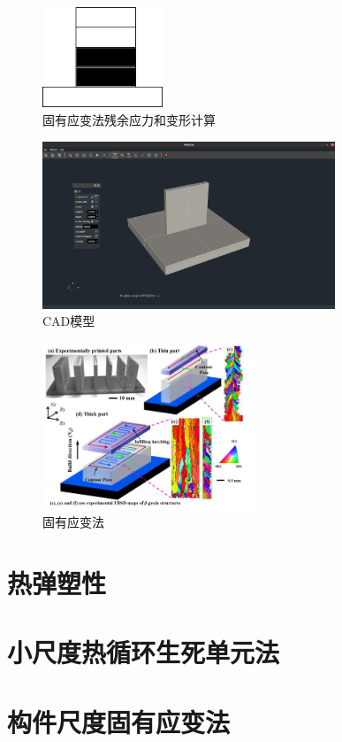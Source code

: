 \begin{figure}[!htbp]
  \centering
  \includegraphics[height=3cm]{fig/4/4.png}
  \caption{固有应变法残余应力和变形计算}
  \label{fig:4-4}
\end{figure}

\begin{figure}[!htbp]
  \centering
  \includegraphics[height=5cm]{fig/4/5.png}
  \caption{CAD模型}
  \label{fig:4-5}
\end{figure}

\begin{figure}[!htbp]
  \centering
  \includegraphics[height=5cm]{fig/4/6.png}
  \caption{固有应变法}
  \label{fig:4-6}
\end{figure}

\section{热弹塑性}

\section{小尺度热循环生死单元法}

\section{构件尺度固有应变法}
